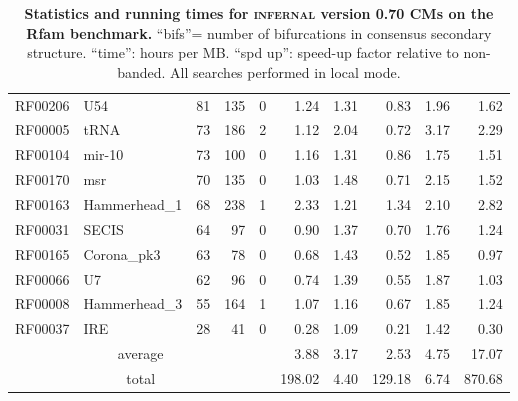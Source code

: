 \begin{table}
\begin{center}
\begin{tabular}{|ll|rrr|rr|rr|r|}
RF00206 & U54 & 81 & 135 & 0 & 1.24 & 1.31 & 0.83 & 1.96 & 1.62 \\  
RF00005 & tRNA & 73 & 186 & 2 & 1.12 & 2.04 & 0.72 & 3.17 & 2.29 \\  
RF00104 & mir-10 & 73 & 100 & 0 & 1.16 & 1.31 & 0.86 & 1.75 & 1.51 \\  
RF00170 & msr & 70 & 135 & 0 & 1.03 & 1.48 & 0.71 & 2.15 & 1.52 \\  
RF00163 & Hammerhead\_1 & 68 & 238 & 1 & 2.33 & 1.21 & 1.34 & 2.10 & 2.82 \\  
RF00031 & SECIS & 64 & 97 & 0 & 0.90 & 1.37 & 0.70 & 1.76 & 1.24 \\  
RF00165 & Corona\_pk3 & 63 & 78 & 0 & 0.68 & 1.43 & 0.52 & 1.85 & 0.97 \\  
RF00066 & U7 & 62 & 96 & 0 & 0.74 & 1.39 & 0.55 & 1.87 & 1.03 \\  
RF00008 & Hammerhead\_3 & 55 & 164 & 1 & 1.07 & 1.16 & 0.67 & 1.85 & 1.24 \\  
RF00037 & IRE & 28 & 41 & 0 & 0.28 & 1.09 & 0.21 & 1.42 & 0.30 \\ \hline 
\multicolumn{5}{|c|}{average} & 3.88 & 3.17 & 2.53 & 4.75 & 17.07 \\ 
\multicolumn{5}{|c|}{total}   & 198.02 & 4.40 & 129.18 & 6.74 & 870.68 \\ \hline 
\end{tabular}
\end{center}

\caption{\textbf{Statistics and running times for
      \textsc{infernal} version 0.70 CMs on the Rfam benchmark.} ``bifs''=
      number of bifurcations in consensus secondary
      structure. ``time'': hours per MB. ``spd up'': speed-up factor
      relative to non-banded. All searches performed in local mode.}
\label{tbl:rmarkbtimes_l}
\end{table}
